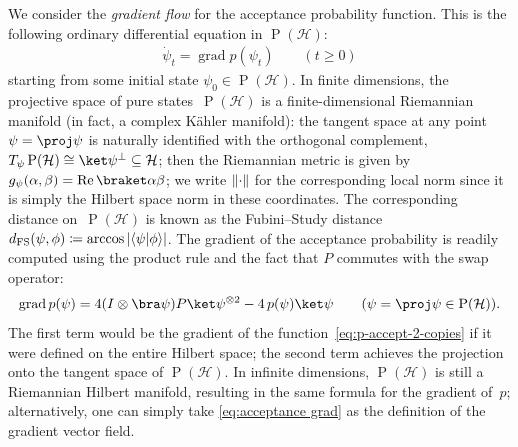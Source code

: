 \documentclass[11pt,a4paper]{article}
\numberwithin{equation}{section}
\newcommand{\ot}{\otimes}
\renewcommand{\Re}{\operatorname{Re}}
\newcommand{\HH}{\mathcal{H}}
\newcommand{\1}{\mathbf{1}}
\renewcommand{\S}{\operatorname{S}}
\renewcommand{\P}{\operatorname{P}}
\DeclareMathOperator{\grad}{grad}
\DeclarePairedDelimiter\abs{\lvert}{\rvert}
\DeclarePairedDelimiter\norm{\lVert}{\rVert}
\DeclarePairedDelimiter\ip{\langle}{\rangle}
\begin{document}
We consider the \emph{gradient flow} for the acceptance probability function.
This is the following ordinary differential equation in $\P(\HH)$:
\begin{align}\label{eq:gradient flow abstract}
    \dot \psi_t = \grad p(\psi_t) \qquad (t \geq 0)
\end{align}
starting from some initial state $\psi_0 \in \P(\HH)$.
In finite dimensions, the projective space of pure states~$\P(\HH)$ is a finite-dimensional Riemannian manifold (in fact, a complex K\"ahler manifold):
the tangent space at any point $\psi = \proj\psi$ is naturally identified with the orthogonal complement, $T_\psi \P(\HH) \cong \ket\psi^\perp \subseteq \HH$; then the Riemannian metric is given by $g_\psi(\alpha,\beta) = \Re \braket\alpha\beta$; we write $\norm{\cdot}$ for the corresponding local norm since it is simply the Hilbert space norm in these coordinates.
The corresponding distance on~$\P(\HH)$ is known as the Fubini--Study distance~$d_\mathrm{FS}(\psi,\phi) \coloneqq \arccos \, \abs{\ip{\psi|\phi}}$.
The gradient of the acceptance probability is readily computed using the product rule and the fact that $P$ commutes with the swap operator:
\begin{align}\label{eq:acceptance grad}
    \grad p(\psi)
= 4 (I \ot \bra\psi) P \ket\psi^{\ot 2} - 4 \, p(\psi) \ket\psi
\qquad (\psi=\proj\psi \in \P(\HH)).
\end{align}
The first term would be the gradient of the function~\eqref{eq:p-accept-2-copies} if it were defined on the entire Hilbert space; the second term achieves the projection onto the tangent space of $\P(\HH)$.
In infinite dimensions, $\P(\HH)$ is still a Riemannian Hilbert manifold, resulting in the same formula for the gradient of~$p$; alternatively, one can simply take \cref{eq:acceptance grad} as the definition of the gradient vector field.
\end{document}
